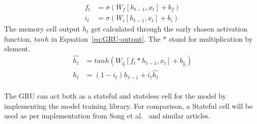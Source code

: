 \begin{equation}
    \begin{split}
        f_t &= \sigma \left (W_{f} \left [h_{t-1}, x_t \right ] + b_f \right ) \\
        i_t &= \sigma \left (W_{i} \left [h_{t-1}, x_t \right ] + b_i \right )
    \end{split}
    \label{eq:GRU-gates}
\end{equation}
The memory cell output $h_t$ get calculated through the early chosen activation function, $tanh$ in Equation~\ref{eq:GRU-output}.
The $\ast$ stand for multiplication by element.
\begin{equation}
    \begin{split}
        \hat{h_t} &= tanh \left (W_{\hat{h}} \left [f_t \ast h_{t-1}, x_t \right] + b_{\hat{h}} \right ) \\
        h_t &= \left (1-i_t \right) h_{t-1}+i_t \hat{h_t}
    \end{split}
    \label{eq:GRU-output}
\end{equation} \\
The GRU can act both as a stateful and stateless cell for the model by implementing the model training library.
For comparison, a Stateful cell will be used as per implementation from Song et al.~\cite{song_lithium-ion_2018} and similar articles.
%
%
%
%

